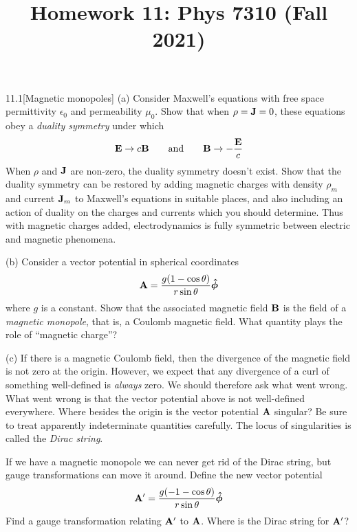 \documentclass[12pt]{article}
\title{Homework 11: Phys 7310 (Fall 2021)}
\begin{document}
\maketitle
\begin{problem}{11.1}[Magnetic monopoles]
(a) Consider Maxwell's equations with free space permittivity $\epsilon_0$ and
permeability $\mu_0$. Show that when $\rho=\vb{J}=0$, these equations obey a
\textit{duality symmetry} under which
\begin{equation}
    \vb{E}\to c\vb{B}\qquad\text{and}\qquad
    \vb{B}\to-\frac{\vb{E}}{c}
\end{equation}
When $\rho$ and $\vb{J}$ are non-zero, the duality symmetry doesn't exist. Show
that the duality symmetry can be restored by adding magnetic charges with
density $\rho_m$ and current $\vb{J}_m$ to Maxwell's equations in suitable
places, and also including an action of duality on the charges and currents
which you should determine. Thus with magnetic charges added, electrodynamics is
fully symmetric between electric and magnetic phenomena.

(b) Consider a vector potential in spherical coordinates
\begin{equation}\label{p1:A}
    \vb{A}=\frac{g(1-\cos\theta)}{r\sin\theta}\bm{\hat{\phi}} 
\end{equation}
where $g$ is a constant. Show that the associated magnetic field $\vb{B}$ is
the field of a \textit{magnetic monopole}, that is, a Coulomb magnetic field.
What quantity plays the role of ``magnetic charge''?

(c) If there is a magnetic Coulomb field, then the divergence of the magnetic
field is not zero at the origin. However, we expect that any divergence of a
curl of something well-defined is \textit{always} zero. We should therefore ask
what went wrong. What went wrong is that the vector potential above is not
well-defined everywhere. Where besides the origin is the vector potential
$\vb{A}$ singular? Be sure to treat apparently indeterminate quantities
carefully. The locus of singularities is called the \textit{Dirac string}.

If we have a magnetic monopole we can never get rid of the Dirac string, but
gauge transformations can move it around. Define the new vector potential
\begin{equation}\label{p1:Ap}
    \vb{A}'=\frac{g(-1-\cos\theta)}{r\sin\theta}\bm{\hat{\phi}}  
\end{equation}
Find a gauge transformation relating $\vb{A}'$ to $\vb{A}$. Where is the Dirac
string for $\vb{A}'$?


\end{problem}
\end{document}
